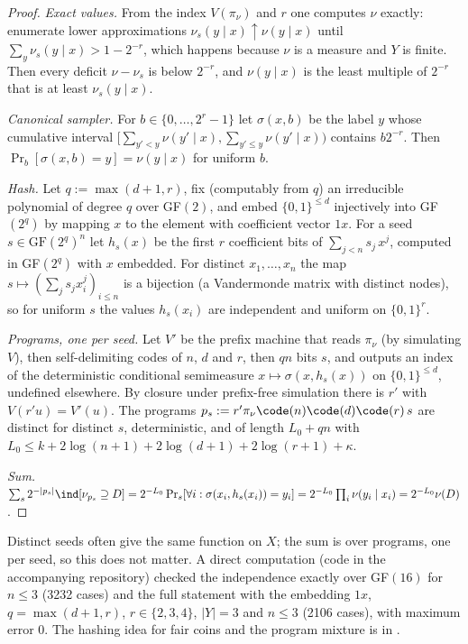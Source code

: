\begin{proof}
\emph{Exact values.} From the index $V(\pi_\nu)$ and $r$ one computes $\nu$ exactly: enumerate lower approximations $\nu_s(y\mid x)\uparrow\nu(y\mid x)$ until $\sum_y\nu_s(y\mid x)>1-2^{-r}$, which happens because $\nu$ is a measure and $Y$ is finite. Then every deficit $\nu-\nu_s$ is below $2^{-r}$, and $\nu(y\mid x)$ is the least multiple of $2^{-r}$ that is at least $\nu_s(y\mid x)$.

\emph{Canonical sampler.} For $b\in\{0,\dots,2^r-1\}$ let $\sigma(x,b)$ be the label $y$ whose cumulative interval $[\sum_{y'<y}\nu(y'\mid x),\sum_{y'\le y}\nu(y'\mid x))$ contains $b2^{-r}$. Then $\Pr_b[\sigma(x,b)=y]=\nu(y\mid x)$ for uniform $b$.

\emph{Hash.} Let $q:=\max(d+1,r)$, fix (computably from $q$) an irreducible polynomial of degree $q$ over GF$(2)$, and embed $\{0,1\}^{\le d}$ injectively into GF$(2^q)$ by mapping $x$ to the element with coefficient vector $1x$. For a seed $s\in\mathrm{GF}(2^q)^n$ let $h_s(x)$ be the first $r$ coefficient bits of $\sum_{j<n}s_j\,x^j$, computed in GF$(2^q)$ with $x$ embedded. For distinct $x_1,\dots,x_n$ the map $s\mapsto(\sum_js_jx_i^j)_{i\le n}$ is a bijection (a Vandermonde matrix with distinct nodes), so for uniform $s$ the values $h_s(x_i)$ are independent and uniform on $\{0,1\}^r$.

\emph{Programs, one per seed.} Let $V'$ be the prefix machine that reads $\pi_\nu$ (by simulating $V$), then self-delimiting codes of $n$, $d$ and $r$, then $qn$ bits $s$, and outputs an index of the deterministic conditional semimeasure $x\mapsto\sigma(x,h_s(x))$ on $\{0,1\}^{\le d}$, undefined elsewhere. By closure under prefix-free simulation there is $r'$ with $V(r'u)=V'(u)$. The programs $p_s:=r'\pi_\nu\code(n)\code(d)\code(r)\,s$ are distinct for distinct $s$, deterministic, and of length $L_0+qn$ with $L_0\le k+2\log(n+1)+2\log(d+1)+2\log(r+1)+\kappa$.

\emph{Sum.} $\sum_s2^{-|p_s|}\ind[\nu_{p_s}\supseteq D]=2^{-L_0}\Pr_s[\forall i:\sigma(x_i,h_s(x_i))=y_i]=2^{-L_0}\prod_i\nu(y_i\mid x_i)=2^{-L_0}\nu(D)$.
\end{proof}

Distinct seeds often give the same function on $X$; the sum is over programs, one per seed, so this does not matter. A direct computation (code in the accompanying repository) checked the independence exactly over GF$(16)$ for $n\le3$ (3232 cases) and the full statement with the embedding $1x$, $q=\max(d+1,r)$, $r\in\{2,3,4\}$, $|Y|=3$ and $n\le3$ (2106 cases), with maximum error $0$. The hashing idea for fair coins and the program mixture is in \citet[the hashing remark]{claudeSFI2026fundamentals}.

